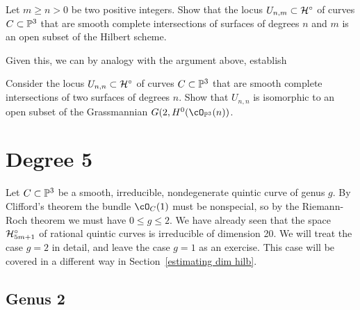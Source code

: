 \begin{exercise}
Let $m \geq n >0$ be two positive integers. Show that the locus $U_{n,m} \subset \cH^\circ$ of curves $C \subset \PP^3$ that are smooth complete intersections of surfaces of degrees $n$ and $m$ is an open subset of the Hilbert scheme.
\end{exercise}

Given this, we can by analogy with the argument above, establish

\begin{exercise}\label{first complete intersection exercise}
Consider  the locus $U_{n,n} \subset \cH^\circ$ of curves $C \subset \PP^3$ that are smooth complete intersections of two surfaces of degrees $n$. Show that $U_{n,n}$ 
is isomorphic to an open subset of the Grassmannian $G(2, H^0(\cO_{\PP^3}(n))$.
\end{exercise}

%
%

\section{Degree 5}

Let $C \subset \PP^3$ be a smooth, irreducible, nondegenerate quintic curve of genus $g$. By Clifford's theorem the bundle $\cO_C(1)$ must be nonspecial, so  by the Riemann-Roch theorem we must have $0\leq g \leq 2$. We have already seen that the space $\cH^\circ_{5m+1}$ of rational quintic curves is irreducible of dimension 20. We will treat the case $g=2$ in detail, and leave the case $g=1$ as an exercise. This case will be covered in a different way in Section~\ref{estimating dim hilb}.

\subsection{Genus 2}

